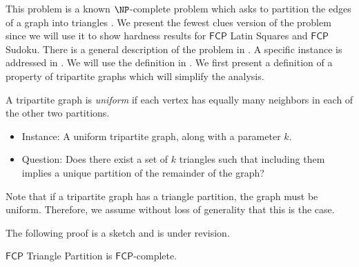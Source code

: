 \documentclass[runningheads,a4paper]{llncs}
\begin{document}
This problem is a known $\NP$-complete problem which asks to partition the edges of a graph into triangles \cite{holyer1981np}. We present the fewest clues version of the problem since we will use it to show hardness results for $\mathsf{FCP}$ Latin Squares and $\mathsf{FCP}$ Sudoku. There is a general description of the problem in \cite{holyer1981np}. A specific instance is addressed in \cite{colbourn1984complexity}. We will use the definition in \cite{colbourn1984complexity}. We first present a definition of a property of tripartite graphs which will simplify the analysis.

\begin{definition}
A tripartite graph is \emph{uniform} if each vertex has equally many neighbors in each of the other two partitions.
\end{definition}

\begin{itemize}
\item Instance: A uniform tripartite graph, along with a parameter $k$.
\item Question: Does there exist a set of $k$ triangles such that including them implies a unique partition of the remainder of the graph?
\end{itemize}

Note that if a tripartite graph has a triangle partition, the graph must be uniform. Therefore, we assume without loss of generality that this is the case. 

The following proof is a sketch and is under revision.

\begin{theorem}
$\mathsf{FCP}$ Triangle Partition is $\mathsf{FCP}$-complete.
\end{theorem}
\end{document}
